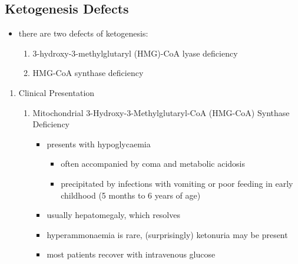 \documentclass{scrartcl}
\begin{document}
\subsection{Ketogenesis Defects}
\label{sec:org4c5718f}
\begin{itemize}
\item there are two defects of ketogenesis:
\begin{enumerate}
\item 3-hydroxy-3-methylglutaryl (HMG)-CoA lyase deficiency
\item HMG-CoA synthase deficiency
\end{enumerate}
\end{itemize}

\begin{enumerate}
\item Clinical Presentation
\label{sec:orgb206498}
\begin{enumerate}
\item Mitochondrial 3-Hydroxy-3-Methylglutaryl-CoA (HMG-CoA) Synthase Deficiency
\label{sec:orgb854bf5}
\begin{itemize}
\item presents with hypoglycaemia
\begin{itemize}
\item often accompanied by coma and metabolic acidosis
\item precipitated by infections with vomiting or poor feeding in early
childhood (5 months to 6 years of age)
\end{itemize}
\item usually hepatomegaly, which resolves
\item hyperammonaemia is rare, (surprisingly) ketonuria may be present
\item most patients recover with intravenous glucose
\end{itemize}


\end{enumerate}
\end{enumerate}
\end{document}
